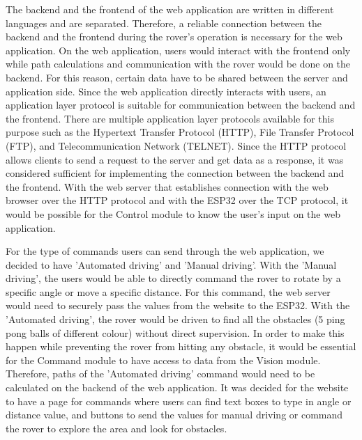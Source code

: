 \documentclass[a4paper]{article}
\begin{document}
The backend and the frontend of the web application are written in different languages 
and are separated. Therefore, a reliable connection between the backend and the frontend during the rover's 
operation is necessary for the web application. On the web application, users would 
interact with the frontend only while path calculations and communication with 
the rover would be done on the backend. For this reason, certain data have to be 
shared between the server and application side. Since the web application directly interacts 
with users, an application layer protocol is suitable for communication between the 
backend and the frontend. There are multiple application layer protocols available 
for this purpose such as the Hypertext Transfer Protocol (HTTP), File Transfer Protocol (FTP), 
and Telecommunication Network (TELNET). Since the HTTP protocol allows clients to send 
a request to the server and get data as a response, it was considered sufficient for 
implementing the connection between the backend and the frontend. With the web server that 
establishes connection with the web browser over the HTTP protocol and with the ESP32 over 
the TCP protocol, it would be possible for the Control module to know the user's input on 
the web application. 

For the type of commands users can send through the web application, we decided to have 
'Automated driving' and 'Manual driving'. With the 'Manual driving', the users would be able 
to directly command the rover to rotate by a specific angle or move a specific distance. For 
this command, the web server would need to securely pass the values from the website to the ESP32. 
With the 'Automated driving', the rover would be driven to find all the obstacles (5 ping pong 
balls of different colour) without direct supervision. In order to make this happen while 
preventing the rover from hitting any obstacle, it would be essential for the Command module 
to have access to data from the Vision module. Therefore, paths of the 'Automated driving' 
command would need to be calculated on the backend of the web application. It was decided for 
the website to have a page for commands where users can find text boxes to type in angle or distance 
value, and buttons to send the values for manual driving or command the rover to explore the area 
and look for obstacles. 
\end{document}
